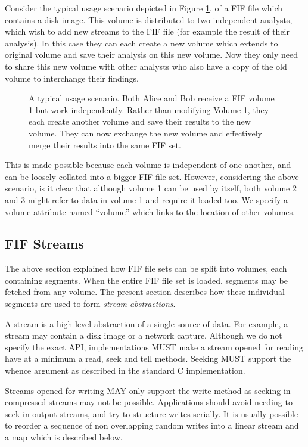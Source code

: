 \documentclass[12pt, conference]{IEEEtran}
\begin{document}
Consider the typical usage scenario depicted in Figure \ref{usage}, of
a FIF file which contains a disk image. This volume is distributed to
two independent analysts, which wish to add new streams to the FIF
file (for example the result of their analysis). In this case they can
each create a new volume which extends to original volume and save
their analysis on this new volume. Now they only need to share this
new volume with other analysts who also have a copy of the old volume
to interchange their findings. 

\begin{figure}[tb]
  \begin{center}
  \mbox{\columnwidth {}}
  \caption{A typical usage scenario. Both Alice and Bob receive a FIF
volume 1 but work independently. Rather than modifying Volume 1, they
each create another volume and save their results to the new
volume. They can now exchange the new volume and effectively merge
their results into the same FIF set.}
  \label{usage}
  \end{center}
\end{figure}

This is made possible because each volume is independent of one
another, and can be loosely collated into a bigger FIF file
set. However, considering the above scenario, is it clear that
although volume 1 can be used by itself, both volume 2 and 3 might
refer to data in volume 1 and require it loaded too. We specify a
volume attribute named ``volume'' which links to the location of other
volumes.

\subsection{FIF Streams}
The above section explained how FIF file sets can be split into
volumes, each containing segments. When the entire FIF file set is
loaded, segments may be fetched from any volume. The present section
describes how these individual segments are used to form {\em stream
abstractions}.

A stream is a high level abstraction of a single source of data. For
example, a stream may contain a disk image or a network
capture. Although we do not specify the exact API, implementations
MUST make a stream opened for reading have at a minimum a read, seek
and tell methods. Seeking MUST support the whence argument as
described in the standard C implementation.

Streams opened for writing MAY only support the write method as
seeking in compressed streams may not be possible. Applications should
avoid needing to seek in output streams, and try to structure writes
serially. It is usually possible to reorder a sequence of non
overlapping random writes into a linear stream and a map which is
described below.
\end{document}
